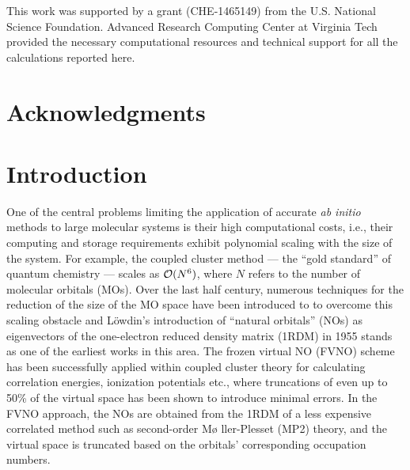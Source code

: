\documentclass[12pt]{report}
\begin{document}
\vfill

This work was supported by a grant (CHE-1465149) from
the U.S. National Science Foundation. Advanced Research Computing 
Center at Virginia Tech provided the necessary computational resources and technical 
support for all the calculations reported here.

\pagebreak

 \chapter*{Acknowledgments}

\tableofcontents
\pagebreak

\listoffigures
\pagebreak

\listoftables
\pagebreak

\pagestyle{myheadings}

\chapter{Introduction}

One of the central problems limiting the application of accurate {\em ab
initio} methods to large molecular systems is their high computational costs,
i.e., their computing and storage requirements exhibit polynomial scaling with
the size of the system.  For example, the coupled cluster method --- the
``gold standard'' of quantum chemistry --- scales as ${\cal O}(N^6)$, where
$N$ refers to the number of molecular orbitals (MOs). 
Over the last half
century, numerous techniques for the reduction of the size of the MO space
have been introduced to to overcome this scaling obstacle
 and L{\"o}wdin’s
introduction\cite{Lowdin55} of ``natural orbitals'' (NOs) as eigenvectors of
the one-electron reduced density matrix (1RDM) in 1955 stands as one of the
earliest works in this area. The frozen virtual NO (FVNO) scheme has been
successfully applied within coupled cluster theory for calculating correlation
energies, ionization potentials etc., where truncations of even up to 50\% of
the virtual space has been shown to introduce minimal
errors.\cite{Landau10,Mester17}  In the FVNO approach, the NOs are obtained
from the 1RDM of a less expensive correlated method such as second-order M\o
ller-Plesset (MP2) theory, and the virtual space is truncated based on the
orbitals' corresponding occupation numbers.
\end{document}

